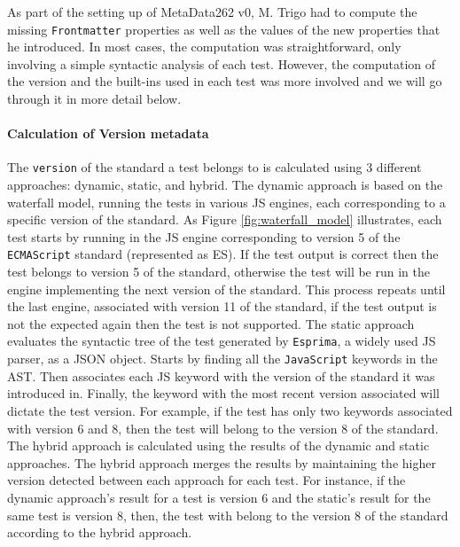\documentclass[runningheads]{llncs}
\begin{document}
As part of the setting up of MetaData262 v0,  M. Trigo had to compute the missing \texttt{Frontmatter} properties as well as the values of the new properties that he introduced. In most cases, the computation was straightforward, only involving a simple syntactic analysis of each test. However, the computation of the version and the built-ins used in each test was more involved and we will go through it in more detail below.

\paragraph{Calculation of Version metadata}
The \texttt{version} of the standard a test belongs to is calculated using 3 different approaches: dynamic, static, and hybrid.
%
The dynamic approach is based on the waterfall model, running the tests in various JS engines, each corresponding to a specific version of the standard. As Figure \ref{fig:waterfall_model} illustrates, each test starts by running in the JS engine corresponding to version 5 of the \texttt{ECMAScript} standard (represented as ES). If the test output is correct then the test belongs to version 5 of the standard, otherwise the test will be run in the engine implementing the next version of the standard. This process repeats until the last engine, associated with version 11 of the standard, if the test output is not the expected again then the test is not supported.
%
The static approach evaluates the syntactic tree of the test generated by \texttt{Esprima}, a widely used JS parser, as a JSON object. Starts by finding all the \texttt{JavaScript} keywords in the AST. Then associates each JS keyword with the version of the standard it was introduced in. Finally, the keyword with the most recent version associated will dictate the test version. For example, if the test has only two keywords associated with version 6 and 8, then the test will belong to the version 8 of the standard.
%
The hybrid approach is calculated using the results of the dynamic and static approaches. The hybrid approach merges the results by maintaining the higher version detected between each approach for each test. For instance, if the dynamic approach's result for a test is version 6 and the static's result for the same test is version 8, then, the test with belong to the version 8 of the standard according to the hybrid approach.
\end{document}
